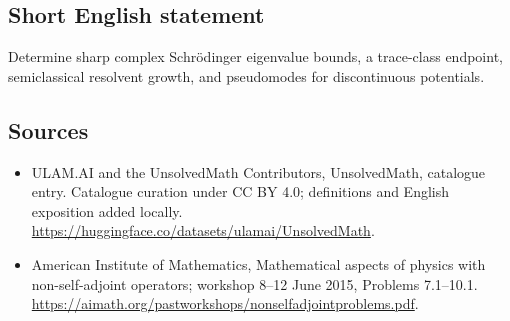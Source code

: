 \documentclass[11pt]{article}
\begin{document}
\subsection{Short English statement}
Determine sharp complex Schrödinger eigenvalue bounds, a trace-class endpoint, semiclassical resolvent growth, and pseudomodes for discontinuous potentials.
\subsection{Sources}
\begin{itemize}
\item[\hypertarget{source:statement:1}{S1}] ULAM.AI and the UnsolvedMath Contributors, UnsolvedMath, catalogue entry. Catalogue curation under CC BY 4.0; definitions and English exposition added locally.
\url{https://huggingface.co/datasets/ulamai/UnsolvedMath}.
\item[\hypertarget{source:statement:2}{S2}] American Institute of Mathematics, Mathematical aspects of physics with non-self-adjoint operators; workshop 8–12 June 2015, Problems 7.1–10.1.
\url{https://aimath.org/pastworkshops/nonselfadjointproblems.pdf}.
\end{itemize}
\label{end:statement}
\end{document}
